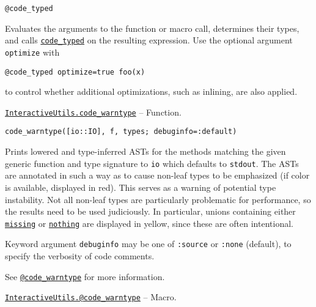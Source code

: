 \begin{adjustwidth}{2em}{0pt}


\begin{verbatim}
@code_typed
\end{verbatim}

Evaluates the arguments to the function or macro call, determines their types, and calls \hyperlink{14801595959157535515}{\texttt{code\_typed}} on the resulting expression. Use the optional argument \texttt{optimize} with


\begin{lstlisting}
@code_typed optimize=true foo(x)
\end{lstlisting}

to control whether additional optimizations, such as inlining, are also applied.



\end{adjustwidth}
\hypertarget{5565852192659724503}{}
\hyperlink{5565852192659724503}{\texttt{InteractiveUtils.code\_warntype}}  -- {Function.}

\begin{adjustwidth}{2em}{0pt}


\begin{verbatim}
code_warntype([io::IO], f, types; debuginfo=:default)
\end{verbatim}

Prints lowered and type-inferred ASTs for the methods matching the given generic function and type signature to \texttt{io} which defaults to \texttt{stdout}. The ASTs are annotated in such a way as to cause {\textquotedbl}non-leaf{\textquotedbl} types to be emphasized (if color is available, displayed in red). This serves as a warning of potential type instability. Not all non-leaf types are particularly problematic for performance, so the results need to be used judiciously. In particular, unions containing either \hyperlink{14596725676261444434}{\texttt{missing}} or \hyperlink{9331422207248206047}{\texttt{nothing}} are displayed in yellow, since these are often intentional.

Keyword argument \texttt{debuginfo} may be one of \texttt{:source} or \texttt{:none} (default), to specify the verbosity of code comments.

See \hyperlink{7310642359836438564}{\texttt{@code\_warntype}} for more information.



\end{adjustwidth}
\hypertarget{8092893264277772840}{}
\hyperlink{8092893264277772840}{\texttt{InteractiveUtils.@code\_warntype}}  -- {Macro.}

